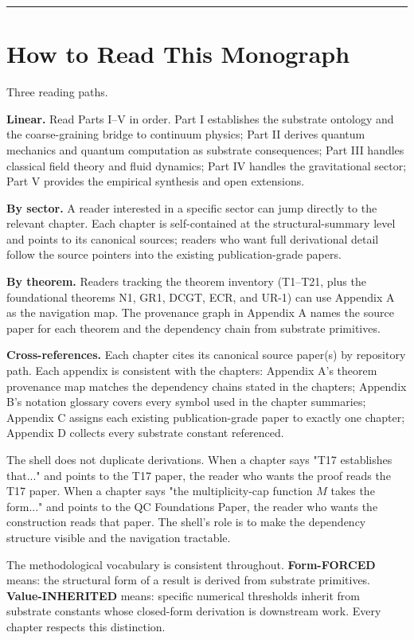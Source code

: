 \documentclass[11pt]{book}
\begin{document}
\bigskip\hrule\bigskip

\chapter*{How to Read This Monograph}

Three reading paths.

\textbf{Linear.} Read Parts I–V in order. Part I establishes the substrate ontology and the coarse-graining bridge to continuum physics; Part II derives quantum mechanics and quantum computation as substrate consequences; Part III handles classical field theory and fluid dynamics; Part IV handles the gravitational sector; Part V provides the empirical synthesis and open extensions.

\textbf{By sector.} A reader interested in a specific sector can jump directly to the relevant chapter. Each chapter is self-contained at the structural-summary level and points to its canonical sources; readers who want full derivational detail follow the source pointers into the existing publication-grade papers.

\textbf{By theorem.} Readers tracking the theorem inventory (T1–T21, plus the foundational theorems N1, GR1, DCGT, ECR, and UR-1) can use Appendix A as the navigation map. The provenance graph in Appendix A names the source paper for each theorem and the dependency chain from substrate primitives.

\textbf{Cross-references.} Each chapter cites its canonical source paper(s) by repository path. Each appendix is consistent with the chapters: Appendix A's theorem provenance map matches the dependency chains stated in the chapters; Appendix B's notation glossary covers every symbol used in the chapter summaries; Appendix C assigns each existing publication-grade paper to exactly one chapter; Appendix D collects every substrate constant referenced.

The shell does not duplicate derivations. When a chapter says "T17 establishes that..." and points to the T17 paper, the reader who wants the proof reads the T17 paper. When a chapter says "the multiplicity-cap function $M$ takes the form..." and points to the QC Foundations Paper, the reader who wants the construction reads that paper. The shell's role is to make the dependency structure visible and the navigation tractable.

The methodological vocabulary is consistent throughout. \textbf{Form-FORCED} means: the structural form of a result is derived from substrate primitives. \textbf{Value-INHERITED} means: specific numerical thresholds inherit from substrate constants whose closed-form derivation is downstream work. Every chapter respects this distinction.
\end{document}
